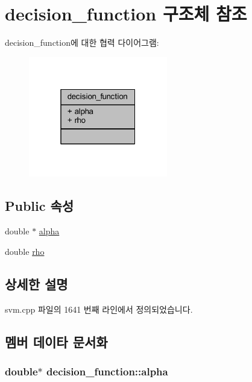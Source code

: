 \hypertarget{structdecision__function}{\section{decision\+\_\+function 구조체 참조}
\label{structdecision__function}
}


decision\+\_\+function에 대한 협력 다이어그램\+:
\nopagebreak
\begin{figure}[H]
\begin{center}
\leavevmode
\includegraphics[width=172pt]{structdecision__function__coll__graph}
\end{center}
\end{figure}
\subsection*{Public 속성}
\begin{DoxyCompactItemize}
\item 
double $\ast$ \hyperlink{structdecision__function_ab79ad1c39d091d4f8ad798abe4223772}{alpha}
\item 
double \hyperlink{structdecision__function_ae2aeeaa508803351b22d4454b81cb375}{rho}
\end{DoxyCompactItemize}


\subsection{상세한 설명}


svm.\+cpp 파일의 1641 번째 라인에서 정의되었습니다.



\subsection{멤버 데이타 문서화}
\hypertarget{structdecision__function_ab79ad1c39d091d4f8ad798abe4223772}{
\subsubsection[{alpha}]{\setlength{\rightskip}{0pt plus 5cm}double$\ast$ decision\+\_\+function\+::alpha}}\label{structdecision__function_ab79ad1c39d091d4f8ad798abe4223772}


